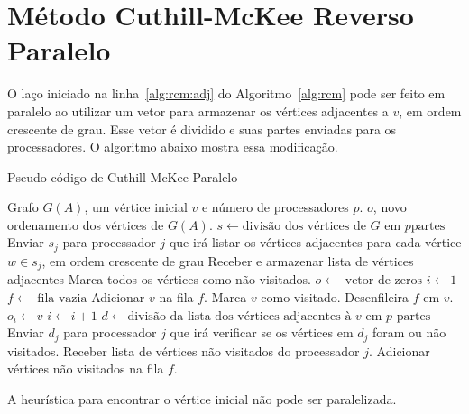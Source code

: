 \section{Método Cuthill-McKee Reverso Paralelo}
O laço iniciado na linha~\ref{alg:rcm:adj} do Algoritmo~\ref{alg:rcm} pode ser
feito em paralelo ao utilizar um vetor para armazenar os vértices adjacentes a
$v$, em ordem crescente de grau. Esse vetor é dividido e suas partes enviadas
para os processadores. O algoritmo abaixo mostra essa modificação.
\begin{algorithm}[hbt]
    \caption{Pseudo-código de Cuthill-McKee Paralelo}
    \label{alg:rcm}
    \begin{algorithmic}[1]
        \REQUIRE Grafo $G(A)$, um vértice inicial $v$ e número de processadores
        $p$.
        \ENSURE $o$, novo ordenamento dos vértices de $G(A)$.
        \STATE $s \longleftarrow \text{divisão dos vértices de $G$ em $p$
        partes}$
            \STATE Enviar $s_j$ para processador $j$ que irá listar os vértices
            adjacentes para cada vértice $w \in s_j$, em ordem crescente de grau
            \STATE Receber e armazenar lista de vértices adjacentes
        \ENDFOR
        \STATE Marca todos os vértices como não visitados.
        \STATE $o \longleftarrow \text{ vetor de zeros}$
        \STATE $i \longleftarrow 1$
        \STATE $f \longleftarrow \text{ fila vazia}$
        \STATE Adicionar $v$ na fila $f$.
        \STATE Marca $v$ como visitado.
            \STATE Desenfileira $f$ em $v$.
            \STATE $o_i \longleftarrow v$
            \STATE $i \longleftarrow i + 1$
            \STATE $d \longleftarrow \text{divisão da lista dos vértices
            adjacentes à $v$ em $p$ partes}$
                \STATE Enviar $d_j$ para processador $j$ que irá verificar se os
                vértices em $d_j$ foram ou não visitados.
                \STATE Receber lista de vértices não visitados do processador
                $j$.
            \ENDFOR
            \STATE Adicionar vértices não visitados na fila $f$.
        \ENDWHILE
    \end{algorithmic}
\end{algorithm}

A heurística para encontrar o vértice inicial não pode ser paralelizada.
